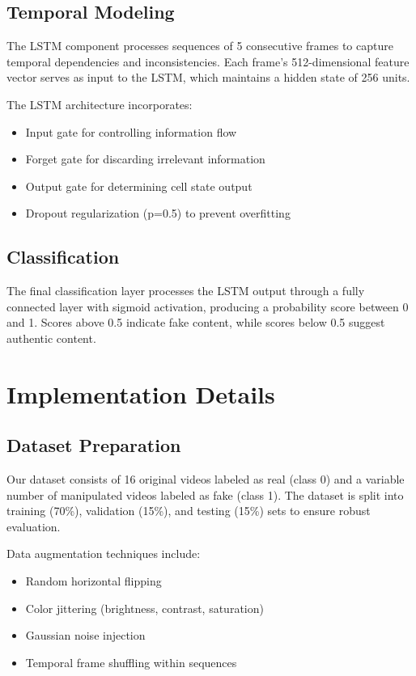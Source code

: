 \documentclass[conference]{IEEEtran}
\begin{document}
\subsection{Temporal Modeling}

The LSTM component processes sequences of 5 consecutive frames to capture temporal dependencies and inconsistencies. Each frame's 512-dimensional feature vector serves as input to the LSTM, which maintains a hidden state of 256 units.

The LSTM architecture incorporates:
\begin{itemize}
\item Input gate for controlling information flow
\item Forget gate for discarding irrelevant information
\item Output gate for determining cell state output
\item Dropout regularization (p=0.5) to prevent overfitting
\end{itemize}

\subsection{Classification}

The final classification layer processes the LSTM output through a fully connected layer with sigmoid activation, producing a probability score between 0 and 1. Scores above 0.5 indicate fake content, while scores below 0.5 suggest authentic content.

\section{Implementation Details}

\subsection{Dataset Preparation}

Our dataset consists of 16 original videos labeled as real (class 0) and a variable number of manipulated videos labeled as fake (class 1). The dataset is split into training (70\%), validation (15\%), and testing (15\%) sets to ensure robust evaluation.

Data augmentation techniques include:
\begin{itemize}
\item Random horizontal flipping
\item Color jittering (brightness, contrast, saturation)
\item Gaussian noise injection
\item Temporal frame shuffling within sequences
\end{itemize}
\end{document}
